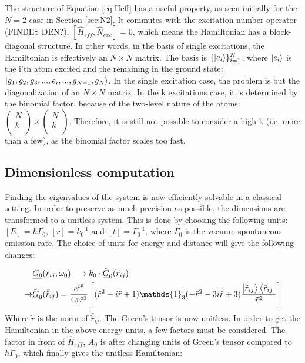 \documentclass{article}
\begin{document}
The structure of Equation \ref{eq:Heff} has a useful property, as seen initially for the $N=2$ case in Section \ref{sec:N2}. It commutes with the excitation-number operator (FINDES DEN?), $[\hat{H}_{eff}, \hat{N}_{exc}] = 0$, which means the Hamiltonian has a block-diagonal structure. In other words, in the basis of single excitations, the Hamiltonian is effectively an $N \times N$ matrix. The basis is $\{ \ket{e_i} \}_{i=1}^N$, where $\ket{e_i}$ is the i'th atom excited and the remaining in the ground state: $\ket{g_1, g_2, g_3, ..., e_i, ..., g_{N-1}, g_N}$. In the single excitation case, the problem is but the diagonalization of an $N \times N$ matrix. In the k excitations case, it is determined by the binomial factor, because of the two-level nature of the atoms: $\begin{pmatrix} N \\ k \\ \end{pmatrix} \times \begin{pmatrix} N \\ k \\ \end{pmatrix}$. Therefore, it is still not possible to consider a high k (i.e. more than a few), as the binomial factor scales too fast. 

\subsection{Dimensionless computation}\label{sec:dimless}

Finding the eigenvalues of the system is now efficiently solvable in a classical setting. In order to preserve as much precision as possible, the dimensions are transformed to a unitless system. This is done by choosing the following units: $[E]=\hbar \Gamma_0$, $[r] = k_0^{-1}$ and $[t] = \Gamma_0^{-1}$, where $\Gamma_0$ is the vacuum spontaneous emission rate. The choice of units for energy and distance will give the following changes: 

\begin{equation}\label{eq:Green_unitless}
    \begin{split}
        &\underline{G_0}(\bar{r}_{ij}, \omega_0) \longrightarrow k_0 \cdot \tilde{\underline{G}}_0(\bar{\tilde{r}}_{ij}) \\
        \rightarrow &\tilde{\underline{G}}_0(\bar{\tilde{r}}_{ij}) = \frac{e^{i\tilde{r}}}{4\pi \tilde{r}^3} \left[ (\tilde{r}^2 - i\tilde{r} + 1) \mathds{1}_3 (-\tilde{r}^2 - 3i\tilde{r} + 3) \frac{\ket{\bar{\tilde{r}}_{ij}}\bra{\bar{\tilde{r}}_{ij}}}{\tilde{r}^2} \right]
    \end{split}
\end{equation}
Where $\tilde{r}$ is the norm of $\bar{\tilde{r}}_{ij}$. The Green's tensor is now unitless. In order to get the Hamiltonian in the above energy units, a few factors must be considered. The factor in front of $\hat{H}_{eff}$, $A_0$ is after changing units of Green's tensor compared to $\hbar \Gamma_0$, which finally gives the unitless Hamiltonian:
\end{document}
